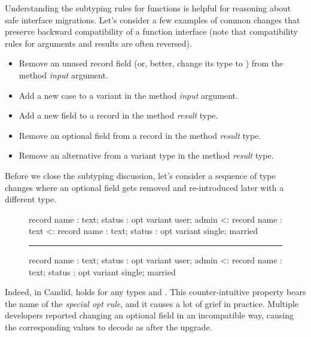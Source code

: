 \documentclass{article}
\begin{document}
Understanding the subtyping rules for functions is helpful for reasoning about safe interface migrations.
Let's consider a few examples of common changes that preserve backward compatibility of a function interface (note that compatibility rules for arguments and results are often reversed).

\begin{itemize}
    \item
    Remove an unused record field (or, better, change its type to ) from the method \emph{input} argument.
    \item
    Add a new case to a variant in the method \emph{input} argument.
    \item
    Add a new field to a record in the method \emph{result} type.
    \item
    Remove an optional field from a record in the method \emph{result} type.
    \item
    Remove an alternative from a variant type in the method \emph{result} type.
\end{itemize}

Before we close the subtyping discussion, let's consider a sequence of type changes where an optional field gets removed and re-introduced later with a different type.

\begin{figure}
\begin{code}[candid]
   record { name : text; status : opt variant { user;   admin   } }
<: record { name : text } 
<: record { name : text; status : opt variant { single; married } } 
\hrule    record { name : text; status : opt variant { user;   admin   } }
<: record { name : text; status : opt variant { single; married } }
\end{code}
\end{figure}

Indeed, in Candid,  holds for any types  and .
This counter-intuitive property bears the name of the \emph{special opt rule}, and it causes a lot of grief in practice.
Multiple developers reported changing an optional field in an incompatible way, causing the corresponding values to decode as  after the upgrade.
\end{document}
